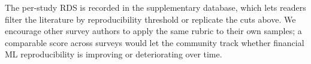 The per-study RDS is recorded in the supplementary database, which lets readers filter the literature by reproducibility threshold or replicate the cuts above. We encourage other survey authors to apply the same rubric to their own samples; a comparable score across surveys would let the community track whether financial ML reproducibility is improving or deteriorating over time.
